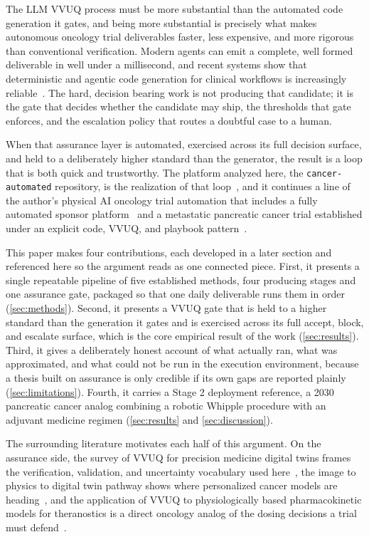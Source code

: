 The LLM VVUQ process
must be more substantial than the automated code generation it gates, and being
more substantial is precisely what makes autonomous oncology trial deliverables
faster, less expensive, and more rigorous than conventional verification. Modern agents can emit a complete, well formed deliverable
in well under a millisecond, and recent systems show that deterministic and
agentic code generation for clinical workflows is increasingly
reliable~\cite{trooskens2026compiled, carlisle2026pipeline, yan2026clinagent}.
The hard, decision bearing work is not producing that candidate; it is the gate
that decides whether the candidate may ship, the thresholds that gate enforces,
and the escalation policy that routes a doubtful case to a human. 

When that
assurance layer is automated, exercised across its full decision surface, and
held to a deliberately higher standard than the generator, the result is a loop
that is both quick and trustworthy. The platform analyzed here, the
\texttt{cancer-automated} repository, is the realization of that
loop~\cite{repo-cancer-automated}, and it continues a line of the author's
physical AI oncology trial automation that includes a fully automated sponsor
platform~\cite{kawchak2026sponsor} and a metastatic pancreatic cancer trial
established under an explicit code, VVUQ, and playbook
pattern~\cite{kawchak2025qsppdac}.

This paper makes four contributions, each developed in a later section and
referenced here so the argument reads as one connected piece. First, it presents
a single repeatable pipeline of five established methods, four producing stages
and one assurance gate, packaged so that one daily deliverable runs them in order
(\autoref{sec:methods}). Second, it presents a VVUQ gate that is held to a higher
standard than the generation it gates and is exercised across its full accept,
block, and escalate surface, which is the core empirical result of the work
(\autoref{sec:results}). Third, it gives a deliberately honest account of what
actually ran, what was approximated, and what could not be run in the execution
environment, because a thesis built on assurance is only credible if its own gaps
are reported plainly (\autoref{sec:limitations}). Fourth, it carries a Stage 2
deployment reference, a 2030 pancreatic cancer analog combining a robotic Whipple
procedure with an adjuvant medicine regimen (\autoref{sec:results} and
\autoref{sec:discussion}).

The surrounding literature motivates each half of this argument. On the assurance
side, the survey of VVUQ for precision medicine digital twins frames the
verification, validation, and uncertainty vocabulary used here~\cite{sel2025vvuq},
the image to physics to digital twin pathway shows where personalized cancer
models are heading~\cite{moradi2026twins}, and the application of VVUQ to
physiologically based pharmacokinetic models for theranostics is a direct oncology
analog of the dosing decisions a trial must defend~\cite{zaid2025pbpk}. 

